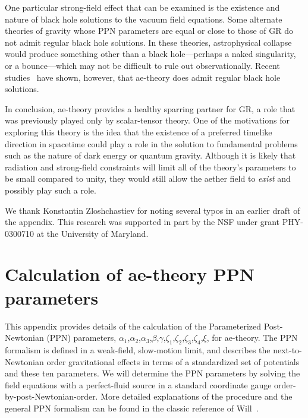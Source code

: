 \documentclass[aps,prd,preprint,amsmath,amssymb]{revtex4}
\begin{document}
One particular strong-field effect that can be examined is the
existence and nature of black hole solutions to the vacuum field
equations. Some alternate theories of gravity whose PPN parameters
are equal or close to those of GR do not admit regular black hole
solutions. In these theories, astrophysical collapse would produce
something other than a black hole---perhaps a naked singularity,
or a bounce---which may not be difficult to rule out
observationally. Recent studies~\cite{ElingJbh} have shown,
however, that ae-theory does admit regular black hole solutions.

In conclusion, ae-theory provides a healthy sparring partner for
GR, a role that was previously played only by scalar-tensor
theory. One of the motivations for exploring this theory is the
idea that the existence of a preferred timelike direction in
spacetime could play a role in the solution to fundamental
problems such as the nature of dark energy or quantum gravity.
Although it is likely that radiation and strong-field constraints
will limit all of the theory's parameters to be small compared to
unity, they would still allow the  aether field to {\it exist}
and possibly play such a role.
%
%
\begin{acknowledgments}
%
We thank Konstantin Zloshchastiev for noting
several typos in an earlier draft of the appendix.
This research was supported in part by the NSF under grant
PHY-0300710 at the University of Maryland.
%
\end{acknowledgments}
%
%
\appendix*
%
\section{Calculation of ae-theory PPN parameters}

%
%
This appendix provides details of the calculation of the
Parameterized Post-Newtonian (PPN) parameters,
$\alpha_1$,$\alpha_2$,$\alpha_3$,$\beta$,$\gamma$,$\zeta_1$,$\zeta_2$,$\zeta_3$,$\zeta_4$,$\xi$,
for ae-theory.  The PPN formalism is defined in a weak-field,
slow-motion limit, and describes the next-to-Newtonian order
gravitational effects in terms of a standardized set of potentials
and these ten parameters. We will determine the PPN parameters by
solving the field equations with a perfect-fluid source in a
standard coordinate gauge order-by-post-Newtonian-order.  More
detailed explanations of the procedure and the general PPN
formalism can be found in the classic reference of
Will~\cite{WillBook}.
\end{document}
